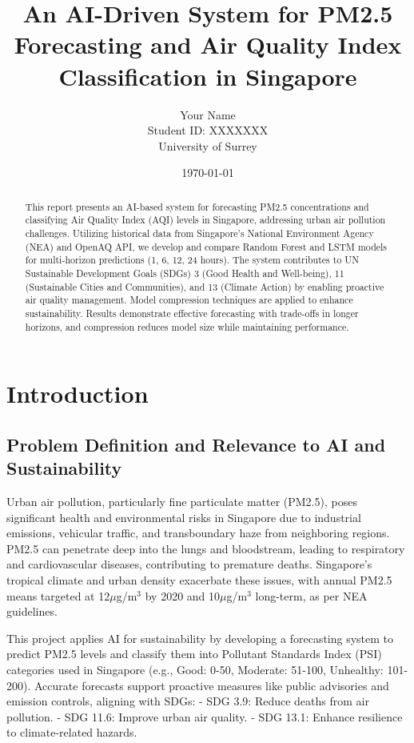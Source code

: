 \documentclass{article}
\title{An AI-Driven System for PM2.5 Forecasting and Air Quality Index Classification in Singapore}
\author{Your Name \\ Student ID: XXXXXXX \\ University of Surrey}
\date{\today}
\begin{document}
\maketitle

\begin{abstract}
This report presents an AI-based system for forecasting PM2.5 concentrations and classifying Air Quality Index (AQI) levels in Singapore, addressing urban air pollution challenges. Utilizing historical data from Singapore's National Environment Agency (NEA) and OpenAQ API, we develop and compare Random Forest and LSTM models for multi-horizon predictions (1, 6, 12, 24 hours). The system contributes to UN Sustainable Development Goals (SDGs) 3 (Good Health and Well-being), 11 (Sustainable Cities and Communities), and 13 (Climate Action) by enabling proactive air quality management. Model compression techniques are applied to enhance sustainability. Results demonstrate effective forecasting with trade-offs in longer horizons, and compression reduces model size while maintaining performance.
\end{abstract}

\section{Introduction}

\subsection{Problem Definition and Relevance to AI and Sustainability}
Urban air pollution, particularly fine particulate matter (PM2.5), poses significant health and environmental risks in Singapore due to industrial emissions, vehicular traffic, and transboundary haze from neighboring regions. PM2.5 can penetrate deep into the lungs and bloodstream, leading to respiratory and cardiovascular diseases, contributing to premature deaths. Singapore's tropical climate and urban density exacerbate these issues, with annual PM2.5 means targeted at 12$\mu$g/m$^3$ by 2020 and 10$\mu$g/m$^3$ long-term, as per NEA guidelines.

This project applies AI for sustainability by developing a forecasting system to predict PM2.5 levels and classify them into Pollutant Standards Index (PSI) categories used in Singapore (e.g., Good: 0-50, Moderate: 51-100, Unhealthy: 101-200). Accurate forecasts support proactive measures like public advisories and emission controls, aligning with SDGs:
- SDG 3.9: Reduce deaths from air pollution.
- SDG 11.6: Improve urban air quality.
- SDG 13.1: Enhance resilience to climate-related hazards.
\end{document}
